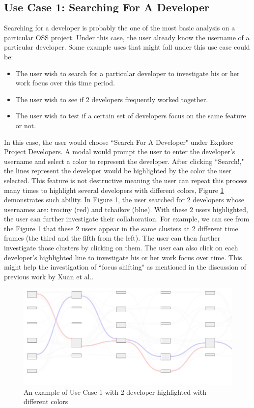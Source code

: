 \documentclass{article}
\begin{document}
\subsection{Use Case 1: Searching For A Developer}
Searching for a developer is probably the one of the most basic analysis on a particular OSS project. Under this case, the user already know the username of a particular developer. Some example uses that might fall under this use case could be:
\begin{itemize}
    \item The user wish to search for a particular developer to investigate his or her work focus over this time period.
    \item The user wish to see if 2 developers frequently worked together.
    \item The user wish to test if a certain set of developers focus on the same feature or not.
\end{itemize}
In this case, the user would choose ``Search For A Developer" under Explore Project Developers. A modal would prompt the user to enter the developer's username and select a color to represent the developer. After clicking ``Search!," the lines represent the developer would be highlighted by the color the user selected. This feature is not destructive meaning the user can repeat this process many times to highlight several developers with different colors, Figure \ref{fig:usecase1} demonstrates such ability. In Figure \ref{fig:usecase1}, the user searched for 2 developers whose usernames are: trociny (red) and tchaikov (blue). With these 2 users highlighted, the user can further investigate their collaboration. For example, we can see from the Figure \ref{fig:usecase1} that these 2 users appear in the same clusters at 2 different time frames (the third and the fifth from the left). The user can then further investigate those clusters by clicking on them. The user can also click on each developer's highlighted line to investigate his or her work focus over time. This might help the investigation of ``focus shifting" as mentioned in the discussion of previous work by Xuan et al.\citep{xuan2014focus}.
\begin{figure}[h!]
\centering
\includegraphics[scale=0.6]{images/usecase1.JPG}
\caption{An example of Use Case 1 with 2 developer highlighted with different colors}
\label{fig:usecase1}
\end{figure}
\end{document}
